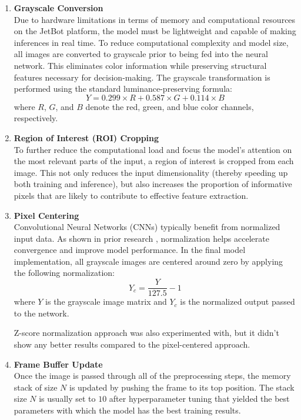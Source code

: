 \begin{enumerate}
  \item \textbf{Grayscale Conversion} \\
    Due to hardware limitations in terms of memory and computational resources on the JetBot platform, the model must be lightweight and capable of making inferences in real time. To reduce computational complexity and model size, all images are converted to grayscale prior to being fed into the neural network. This eliminates color information while preserving structural features necessary for decision-making. The grayscale transformation is performed using the standard luminance-preserving formula:
    \[
      Y = 0.299 \times R + 0.587 \times G + 0.114 \times B
    \]
    where \( R \), \( G \), and \( B \) denote the red, green, and blue color channels, respectively.

  \item \textbf{Region of Interest (ROI) Cropping} \\
    To further reduce the computational load and focus the model’s attention on the most relevant parts of the input, a region of interest is cropped from each image. This not only reduces the input dimensionality (thereby speeding up both training and inference), but also increases the proportion of informative pixels that are likely to contribute to effective feature extraction.

  \item \textbf{Pixel Centering} \\
    Convolutional Neural Networks (CNNs) typically benefit from normalized input data. As shown in prior research \autocite{pal2016preprocessing}, normalization helps accelerate convergence and improve model performance. In the final model implementation, all grayscale images are centered around zero by applying the following normalization:
    \[
      Y_c = \frac{Y}{127.5} - 1
    \]
    where \( Y \) is the grayscale image matrix and \( Y_c \) is the normalized output passed to the network.

    Z-score normalization approach was also experimented with, but it didn't show any better results compared to the pixel-centered approach.

  \item \textbf{Frame Buffer Update} \\
    Once the image is passed through all of the preprocessing steps, the memory stack of size $N$ is updated by pushing the frame to its top position. The stack size $N$ is usually set to $10$ after hyperparameter tuning that yielded the best parameters with which the model has the best training results.
\end{enumerate}

